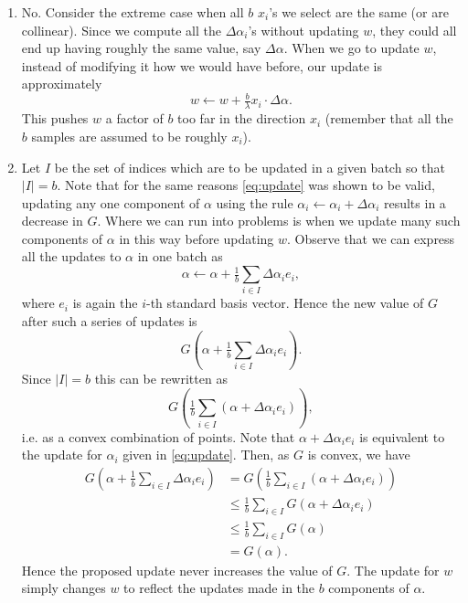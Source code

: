 \documentclass{article}
\begin{document}
\begin{enumerate}
	\item No. Consider the extreme case when all $b$ $x_i$'s we select are the same (or are collinear). Since we compute all the $\Delta\alpha_i$'s without updating $w$, they could all end up having roughly the same value, say $\Delta \alpha$. When we go to update $w$, instead of modifying it how we would have before, our update is approximately
	\begin{equation}
		w\leftarrow w + \tfrac{b}{\lambda}x_i\cdot\Delta\alpha.
	\end{equation}
	This pushes $w$ a factor of $b$ too far in the direction $x_i$ (remember that all the $b$ samples are assumed to be roughly $x_i$).
	\item Let $I$ be the set of indices which are to be updated in a given batch so that $|I|=b$. Note that for the same reasons \eqref{eq:update} was shown to be valid, updating any one component of $\alpha$ using the rule $\alpha_i\leftarrow \alpha_i+\Delta\alpha_i$ results in a decrease in $G$. Where we can run into problems is when we update many such components of $\alpha$ in this way before updating $w$. Observe that we can express all the updates to $\alpha$ in one batch as
	\begin{equation}
		\alpha\leftarrow \alpha+\tfrac1b\sum_{i\in I}\Delta\alpha_ie_i,
	\end{equation}
	where $e_i$ is again the $i$-th standard basis vector. Hence the new value of $G$ after such a series of updates is
	\begin{equation}
		G\left(\alpha+\tfrac1b\sum_{i\in I}\Delta\alpha_ie_i\right).
	\end{equation}
	Since $|I|=b$ this can be rewritten as
	\begin{equation}
		G\left(\tfrac1b\sum_{i\in I}\left(\alpha+\Delta\alpha_ie_i\right)\right),
	\end{equation}
	i.e. as a convex combination of points. Note that $\alpha+\Delta\alpha_ie_i$ is equivalent to the update for $\alpha_i$ given in \eqref{eq:update}. Then, as $G$ is convex, we have
	\begin{align}
		G\left(\alpha+\tfrac1b\sum_{i\in I}\Delta\alpha_ie_i\right) &=G\left(\tfrac1b\sum_{i\in I}\left(\alpha+\Delta\alpha_ie_i\right)\right)\\
		&\leq \tfrac1b\sum_{i\in I}G(\alpha+\Delta\alpha_ie_i)\\
		&\leq \tfrac1b\sum_{i\in I}G(\alpha)\\
		&=G(\alpha).
	\end{align}
	Hence the proposed update never increases the value of $G$. The update for $w$ simply changes $w$ to reflect the updates made in the $b$ components of $\alpha$.


\end{enumerate}
\end{document}
